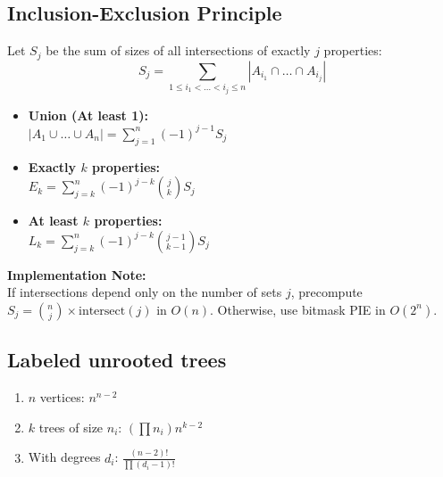 \subsection{Inclusion-Exclusion Principle}
Let $S_j$ be the sum of sizes of all intersections of exactly $j$ properties:
\[ S_j = \sum_{1 \le i_1 < \dots < i_j \le n} |A_{i_1} \cap \dots \cap A_{i_j}| \]

\begin{itemize}
    \item \textbf{Union (At least 1):} \\
          $|A_1 \cup \dots \cup A_n| = \sum_{j=1}^n (-1)^{j-1} S_j$

    \item \textbf{Exactly $k$ properties:} \\
          $E_k = \sum_{j=k}^n (-1)^{j-k} \binom{j}{k} S_j$

    \item \textbf{At least $k$ properties:} \\
          $L_k = \sum_{j=k}^n (-1)^{j-k} \binom{j-1}{k-1} S_j$
\end{itemize}

\textbf{Implementation Note:} \\
If intersections depend only on the number of sets $j$, precompute $S_j = \binom{n}{j} \times \text{intersect}(j)$ in $O(n)$. Otherwise, use bitmask PIE in $O(2^n)$.

\subsection{Labeled unrooted trees}
\begin{enumerate}[resume]
\item $n$ vertices: $n^{n-2}$
\item $k$ trees of size $n_i$: $(\prod n_i) n^{k-2}$
\item With degrees $d_i$: $\frac{(n-2)!}{\prod (d_i-1)!}$
\end{enumerate}

